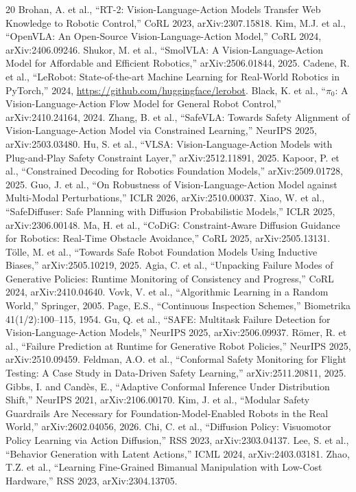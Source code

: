 \documentclass[conference]{IEEEtran}
\begin{document}
\begin{thebibliography}{20}
 Brohan, A. et al., ``RT-2: Vision-Language-Action Models Transfer Web Knowledge to Robotic Control,'' CoRL 2023, arXiv:2307.15818.
 Kim, M.J. et al., ``OpenVLA: An Open-Source Vision-Language-Action Model,'' CoRL 2024, arXiv:2406.09246.
 Shukor, M. et al., ``SmolVLA: A Vision-Language-Action Model for Affordable and Efficient Robotics,'' arXiv:2506.01844, 2025.
 Cadene, R. et al., ``LeRobot: State-of-the-art Machine Learning for Real-World Robotics in PyTorch,'' 2024, \url{https://github.com/huggingface/lerobot}.
 Black, K. et al., ``$\pi_0$: A Vision-Language-Action Flow Model for General Robot Control,'' arXiv:2410.24164, 2024.
 Zhang, B. et al., ``SafeVLA: Towards Safety Alignment of Vision-Language-Action Model via Constrained Learning,'' NeurIPS 2025, arXiv:2503.03480.
 Hu, S. et al., ``VLSA: Vision-Language-Action Models with Plug-and-Play Safety Constraint Layer,'' arXiv:2512.11891, 2025.
 Kapoor, P. et al., ``Constrained Decoding for Robotics Foundation Models,'' arXiv:2509.01728, 2025.
 Guo, J. et al., ``On Robustness of Vision-Language-Action Model against Multi-Modal Perturbations,'' ICLR 2026, arXiv:2510.00037.
 Xiao, W. et al., ``SafeDiffuser: Safe Planning with Diffusion Probabilistic Models,'' ICLR 2025, arXiv:2306.00148.
 Ma, H. et al., ``CoDiG: Constraint-Aware Diffusion Guidance for Robotics: Real-Time Obstacle Avoidance,'' CoRL 2025, arXiv:2505.13131.
 T{\"o}lle, M. et al., ``Towards Safe Robot Foundation Models Using Inductive Biases,'' arXiv:2505.10219, 2025.
 Agia, C. et al., ``Unpacking Failure Modes of Generative Policies: Runtime Monitoring of Consistency and Progress,'' CoRL 2024, arXiv:2410.04640.
 Vovk, V. et al., ``Algorithmic Learning in a Random World,'' Springer, 2005.
 Page, E.S., ``Continuous Inspection Schemes,'' Biometrika 41(1/2):100--115, 1954.
 Gu, Q. et al., ``SAFE: Multitask Failure Detection for Vision-Language-Action Models,'' NeurIPS 2025, arXiv:2506.09937.
 R{\"o}mer, R. et al., ``Failure Prediction at Runtime for Generative Robot Policies,'' NeurIPS 2025, arXiv:2510.09459.
 Feldman, A.O. et al., ``Conformal Safety Monitoring for Flight Testing: A Case Study in Data-Driven Safety Learning,'' arXiv:2511.20811, 2025.
 Gibbs, I. and Cand{\`e}s, E., ``Adaptive Conformal Inference Under Distribution Shift,'' NeurIPS 2021, arXiv:2106.00170.
 Kim, J. et al., ``Modular Safety Guardrails Are Necessary for Foundation-Model-Enabled Robots in the Real World,'' arXiv:2602.04056, 2026.
 Chi, C. et al., ``Diffusion Policy: Visuomotor Policy Learning via Action Diffusion,'' RSS 2023, arXiv:2303.04137.
 Lee, S. et al., ``Behavior Generation with Latent Actions,'' ICML 2024, arXiv:2403.03181.
 Zhao, T.Z. et al., ``Learning Fine-Grained Bimanual Manipulation with Low-Cost Hardware,'' RSS 2023, arXiv:2304.13705.
\end{thebibliography}
\end{document}

